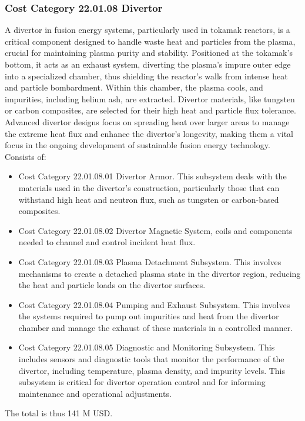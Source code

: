 \subsubsection*{Cost Category 22.01.08 Divertor}

A divertor in fusion energy systems, particularly used in tokamak reactors, is a critical component designed to handle waste heat and particles from the plasma, crucial for maintaining plasma purity and stability. Positioned at the tokamak's bottom, it acts as an exhaust system, diverting the plasma's impure outer edge into a specialized chamber, thus shielding the reactor's walls from intense heat and particle bombardment. Within this chamber, the plasma cools, and impurities, including helium ash, are extracted. Divertor materials, like tungsten or carbon composites, are selected for their high heat and particle flux tolerance. Advanced divertor designs focus on spreading heat over larger areas to manage the extreme heat flux and enhance the divertor's longevity, making them a vital focus in the ongoing development of sustainable fusion energy technology.\\

Consists of:

\begin{itemize}
    \item Cost Category 22.01.08.01 Divertor Armor. This subsystem deals with the materials used in the divertor's construction, particularly those that can withstand high heat and neutron flux, such as tungsten or carbon-based composites.

\item Cost Category 22.01.08.02 Divertor Magnetic System, coils and components needed to channel and control incident heat flux.

\item  Cost Category 22.01.08.03 Plasma Detachment Subsystem. This involves mechanisms to create a detached plasma state in the divertor region, reducing the heat and particle loads on the divertor surfaces. 


\item Cost Category 22.01.08.04 Pumping and Exhaust Subsystem. This involves the systems required to pump out impurities and heat from the divertor chamber and manage the exhaust of these materials in a controlled manner.

\item Cost Category 22.01.08.05 Diagnostic and Monitoring Subsystem. This includes sensors and diagnostic tools that monitor the performance of the divertor, including temperature, plasma density, and impurity levels. This subsystem is critical for divertor operation control and for informing maintenance and operational adjustments.
\end{itemize}

 The total is thus 141 M USD.

